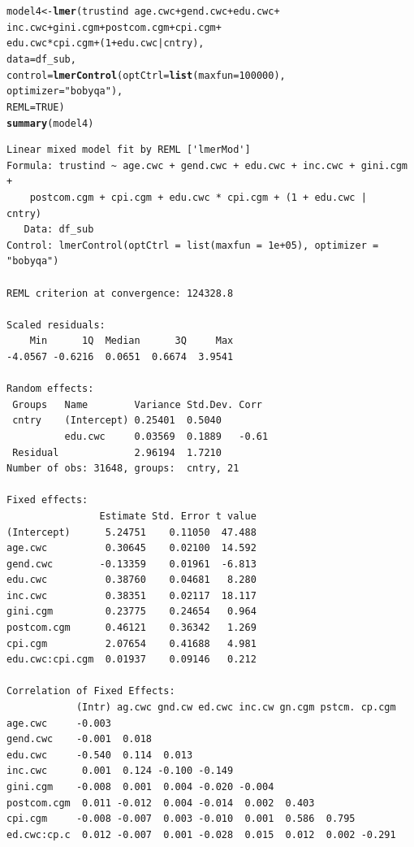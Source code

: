 \documentclass[12pt,english]{article}\usepackage[]{graphicx}\usepackage[usenames, dvipsnames]{xcolor}
\makeatletter
\newcommand{\hlnum}[1]{\textcolor[rgb]{0.686,0.059,0.569}{#1}}%
\newcommand{\hlstr}[1]{\textcolor[rgb]{0.192,0.494,0.8}{#1}}%
\newcommand{\hlopt}[1]{\textcolor[rgb]{0,0,0}{#1}}%
\newcommand{\hlstd}[1]{\textcolor[rgb]{0.345,0.345,0.345}{#1}}%
\newcommand{\hlkwb}[1]{\textcolor[rgb]{0.69,0.353,0.396}{#1}}%
\newcommand{\hlkwc}[1]{\textcolor[rgb]{0.333,0.667,0.333}{#1}}%
\newcommand{\hlkwd}[1]{\textcolor[rgb]{0.737,0.353,0.396}{\textbf{#1}}}%
\newenvironment{kframe}{%
 \def\at@end@of@kframe{}%
 \ifinner\ifhmode%
  \def\at@end@of@kframe{\end{minipage}}%
  \begin{minipage}{\columnwidth}%
 \fi\fi%
 \def\FrameCommand##1{\hskip\@totalleftmargin \hskip-\fboxsep
 \colorbox{shadecolor}{##1}\hskip-\fboxsep
     \hskip-\linewidth \hskip-\@totalleftmargin \hskip\columnwidth}%
 \MakeFramed {\advance\hsize-\width
   \@totalleftmargin\z@ \linewidth\hsize
   \@setminipage}}%
 {\par\unskip\endMakeFramed%
 \at@end@of@kframe}
\newenvironment{knitrout}{}{} %
\makeatother
\begin{document}
\begin{knitrout}
\color{fgcolor}\begin{kframe}
\begin{alltt}
\hlstd{model4} \hlkwb{<-} \hlkwd{lmer}\hlstd{(trustind} \hlopt{~} \hlstd{age.cwc} \hlopt{+} \hlstd{gend.cwc} \hlopt{+} \hlstd{edu.cwc} \hlopt{+}
                 \hlstd{inc.cwc} \hlopt{+} \hlstd{gini.cgm} \hlopt{+} \hlstd{postcom.cgm} \hlopt{+} \hlstd{cpi.cgm} \hlopt{+}
                 \hlstd{edu.cwc}\hlopt{*}\hlstd{cpi.cgm} \hlopt{+} \hlstd{(}\hlnum{1} \hlopt{+} \hlstd{edu.cwc} \hlopt{|} \hlstd{cntry),}
               \hlkwc{data} \hlstd{= df_sub,}
               \hlkwc{control}\hlstd{=}\hlkwd{lmerControl}\hlstd{(}\hlkwc{optCtrl} \hlstd{=} \hlkwd{list}\hlstd{(}\hlkwc{maxfun}\hlstd{=}\hlnum{100000}\hlstd{),}
                                   \hlkwc{optimizer} \hlstd{=} \hlstr{"bobyqa"}\hlstd{),}
               \hlkwc{REML} \hlstd{=} \hlnum{TRUE}\hlstd{)}
\hlkwd{summary}\hlstd{(model4)}
\end{alltt}
\begin{verbatim}
Linear mixed model fit by REML ['lmerMod']
Formula: trustind ~ age.cwc + gend.cwc + edu.cwc + inc.cwc + gini.cgm +  
    postcom.cgm + cpi.cgm + edu.cwc * cpi.cgm + (1 + edu.cwc |      cntry)
   Data: df_sub
Control: lmerControl(optCtrl = list(maxfun = 1e+05), optimizer = "bobyqa")

REML criterion at convergence: 124328.8

Scaled residuals: 
    Min      1Q  Median      3Q     Max 
-4.0567 -0.6216  0.0651  0.6674  3.9541 

Random effects:
 Groups   Name        Variance Std.Dev. Corr 
 cntry    (Intercept) 0.25401  0.5040        
          edu.cwc     0.03569  0.1889   -0.61
 Residual             2.96194  1.7210        
Number of obs: 31648, groups:  cntry, 21

Fixed effects:
                Estimate Std. Error t value
(Intercept)      5.24751    0.11050  47.488
age.cwc          0.30645    0.02100  14.592
gend.cwc        -0.13359    0.01961  -6.813
edu.cwc          0.38760    0.04681   8.280
inc.cwc          0.38351    0.02117  18.117
gini.cgm         0.23775    0.24654   0.964
postcom.cgm      0.46121    0.36342   1.269
cpi.cgm          2.07654    0.41688   4.981
edu.cwc:cpi.cgm  0.01937    0.09146   0.212

Correlation of Fixed Effects:
            (Intr) ag.cwc gnd.cw ed.cwc inc.cw gn.cgm pstcm. cp.cgm
age.cwc     -0.003                                                 
gend.cwc    -0.001  0.018                                          
edu.cwc     -0.540  0.114  0.013                                   
inc.cwc      0.001  0.124 -0.100 -0.149                            
gini.cgm    -0.008  0.001  0.004 -0.020 -0.004                     
postcom.cgm  0.011 -0.012  0.004 -0.014  0.002  0.403              
cpi.cgm     -0.008 -0.007  0.003 -0.010  0.001  0.586  0.795       
ed.cwc:cp.c  0.012 -0.007  0.001 -0.028  0.015  0.012  0.002 -0.291
\end{verbatim}
\end{kframe}
\end{knitrout}
\end{document}
